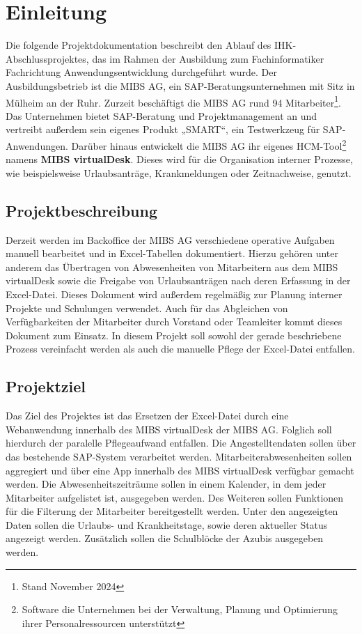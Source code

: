\section{Einleitung}
\label{sec:Einleitung}
Die folgende Projektdokumentation beschreibt den Ablauf des IHK-Abschlussprojektes, das im Rahmen der Ausbildung zum Fachinformatiker Fachrichtung Anwendungsentwicklung durchgeführt wurde. Der Ausbildungsbetrieb ist die MIBS AG, ein SAP-Beratungsunternehmen mit Sitz in Mülheim an der Ruhr. Zurzeit beschäftigt die MIBS AG rund 94 Mitarbeiter\footnote{Stand November 2024}. Das Unternehmen bietet SAP-Beratung und Projektmanagement an und vertreibt außerdem sein eigenes Produkt „SMART“, ein Testwerkzeug für SAP-Anwendungen.
Darüber hinaus entwickelt die MIBS AG ihr eigenes HCM-Tool\footnote{Software die Unternehmen bei der Verwaltung, Planung und Optimierung ihrer Personalressourcen unterstützt} namens \textbf{MIBS virtualDesk}. Dieses wird für die Organisation interner Prozesse, wie beispielsweise Urlaubsanträge, Krankmeldungen oder Zeitnachweise, genutzt.

\subsection{Projektbeschreibung}
\label{sec:Projektbeschreibung}
Derzeit werden im Backoffice der MIBS AG verschiedene operative Aufgaben manuell bearbeitet und in Excel-Tabellen dokumentiert. Hierzu gehören unter anderem das Übertragen von Abwesenheiten von Mitarbeitern aus dem MIBS virtualDesk sowie die Freigabe von Urlaubsanträgen nach deren Erfassung in der Excel-Datei.  
Dieses Dokument wird außerdem regelmäßig zur Planung interner Projekte und Schulungen verwendet. Auch für das Abgleichen von Verfügbarkeiten der Mitarbeiter durch Vorstand oder Teamleiter kommt dieses Dokument zum Einsatz.
In diesem Projekt soll sowohl der gerade beschriebene Prozess vereinfacht werden als auch die manuelle Pflege der Excel-Datei entfallen.


\subsection{Projektziel}
\label{sec:Projektziel}
Das Ziel des Projektes ist das Ersetzen der Excel-Datei durch eine Webanwendung innerhalb des MIBS virtualDesk der MIBS AG.
Folglich soll hierdurch der paralelle Pflegeaufwand entfallen.
Die Angestelltendaten sollen über das bestehende SAP-System verarbeitet werden.
Mitarbeiterabwesenheiten sollen aggregiert und über eine App innerhalb des MIBS virtualDesk verfügbar gemacht werden. Die Abwesenheitszeiträume sollen in einem Kalender, in dem jeder Mitarbeiter aufgelistet ist, ausgegeben werden. Des Weiteren sollen Funktionen für die Filterung der Mitarbeiter bereitgestellt werden.
Unter den angezeigten Daten sollen die Urlaubs- und Krankheitstage, sowie deren aktueller Status angezeigt werden. Zusätzlich sollen die Schulblöcke der Azubis ausgegeben werden.

